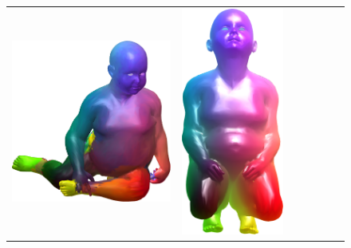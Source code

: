\begin{figure}[b!]
\begin{tabular}[width=0.8\textwidth]{c|cc|cc|cc|}
		\includegraphics[scale=0.34]{figures/kid22_kid19.png}& \includegraphics[scale=0.30]{figures/kid19_base.png} &

\end{tabular}
\end{figure}
